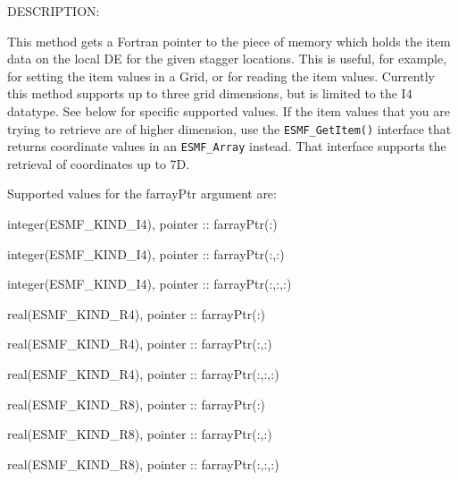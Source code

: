 {\sf DESCRIPTION:\\ }


       This method gets a Fortran pointer to the piece of memory which holds the
       item data on the local DE for the given stagger locations.
       This is useful, for example, for setting the item values in a Grid, or
       for reading the item values.  Currently this method supports up to three
       grid dimensions, but is limited to the I4 datatype.  See below for specific
       supported values.  If the item values that you are trying to retrieve are of
       higher dimension, use the {\tt ESMF\_GetItem()} interface that returns coordinate
       values in an {\tt ESMF\_Array} instead.  That interface supports the retrieval of
       coordinates up to 7D.
  
       Supported values for the farrayPtr argument are:
       \begin{description}
       \item integer(ESMF\_KIND\_I4), pointer :: farrayPtr(:)
       \item integer(ESMF\_KIND\_I4), pointer :: farrayPtr(:,:)
       \item integer(ESMF\_KIND\_I4), pointer :: farrayPtr(:,:,:)
       \item real(ESMF\_KIND\_R4),    pointer :: farrayPtr(:)
       \item real(ESMF\_KIND\_R4),    pointer :: farrayPtr(:,:)
       \item real(ESMF\_KIND\_R4),    pointer :: farrayPtr(:,:,:)
       \item real(ESMF\_KIND\_R8),    pointer :: farrayPtr(:)
       \item real(ESMF\_KIND\_R8),    pointer :: farrayPtr(:,:)
       \item real(ESMF\_KIND\_R8),    pointer :: farrayPtr(:,:,:)
       \end{description}
  
